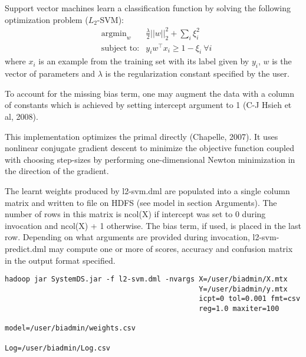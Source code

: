 
Support vector machines learn a classification function by solving the
following optimization problem ($L_2$-SVM):
\begin{eqnarray*}
&\textrm{argmin}_w& \frac{\lambda}{2} ||w||_2^2 + \sum_i \xi_i^2\\
&\textrm{subject to:}& y_i w^{\top} x_i \geq 1 - \xi_i ~ \forall i
\end{eqnarray*}
where $x_i$ is an example from the training set with its label given by $y_i$, 
$w$ is the vector of parameters and $\lambda$ is the regularization constant 
specified by the user.

To account for the missing bias term, one may augment the data with a column
of constants which is achieved by setting intercept argument to 1 (C-J Hsieh 
et al, 2008).

This implementation optimizes the primal directly (Chapelle, 2007). It uses 
nonlinear conjugate gradient descent to minimize the objective function 
coupled with choosing step-sizes by performing one-dimensional Newton 
minimization in the direction of the gradient.
\\


The learnt weights produced by l2-svm.dml are populated into a single column matrix 
and written to file on HDFS (see model in section Arguments). The number of rows in 
this matrix is ncol(X) if intercept was set to 0 during invocation and ncol(X) + 1 
otherwise. The bias term, if used, is placed in the last row. Depending on what arguments
are provided during invocation, l2-svm-predict.dml may compute one or more of scores, 
accuracy and confusion matrix in the output format specified. 
\\


\begin{verbatim}
hadoop jar SystemDS.jar -f l2-svm.dml -nvargs X=/user/biadmin/X.mtx 
                                              Y=/user/biadmin/y.mtx 
                                              icpt=0 tol=0.001 fmt=csv
                                              reg=1.0 maxiter=100 
                                              model=/user/biadmin/weights.csv
                                              Log=/user/biadmin/Log.csv
\end{verbatim}

